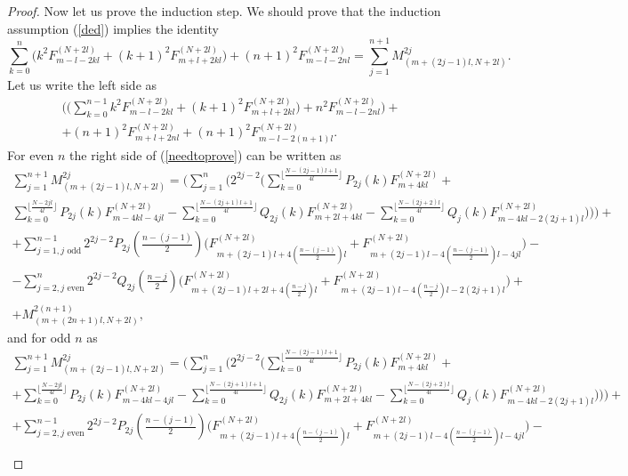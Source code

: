 \documentclass[11pt]{amsart}
\begin{document}
\begin{proof}
	Now let us prove the induction step. We should prove that the induction assumption (\ref{ded}) implies the identity
    \begin{equation}\label{needtoprove}
	\sum_{k=0}^{n}\big(k^2F^{(N+2l)}_{m-l-2kl}+(k+1)^2 F^{(N+2l)}_{m+l+2kl}\big)+(n+1)^2F^{(N+2l)}_{m-l-2nl}=\sum_{j=1}^{n+1}M^{2j}_{(m+(2j-1)l,N+2l)}.
	\end{equation}
	Let us write the left side as
	\begin{eqnarray*}
	\Big(\big(\sum_{k=0}^{n-1}k^2F^{(N+2l)}_{m-l-2kl}+(k+1)^2 F^{(N+2l)}_{m+l+2kl}\big)+n^2F^{(N+2l)}_{m-l-2nl}\Big)+\nonumber \\
	+(n+1)^2 F^{(N+2l)}_{m+l+2nl}+(n+1)^2F^{(N+2l)}_{m-l-2(n+1)l}.
	\end{eqnarray*}
	For even $n$ the right side of (\ref{needtoprove}) can be written as 
	\begin{eqnarray}\label{id-proof}
	\sum_{j=1}^{n+1}M^{2j}_{(m+(2j-1)l,N+2l)}=\Big(\sum_{j=1}^{n}\Big(
	2^{2j-2}\big(\sum_{k=0}^{\lfloor\frac{N-(2j-1)l+1}{4l}\rfloor}P_{2j}(k) F^{(N+2l)}_{m+4kl}+\\
    \sum_{k=0}^{\lfloor\frac{N-2jl}{4l}\rfloor}P_{2j}(k)F^{(N+2l)}_{m-4kl-4jl}-\sum_{k=0}^{\lfloor\frac{N-(2j+1)l+1}{4l}\rfloor}Q_{2j}(k)F^{(N+2l)}_{m+2l+4kl}-\sum_{k=0}^{\lfloor\frac{N-(2j+2)l}{4l}\rfloor}Q_j(k)F^{(N+2l)}_{m-4kl-2(2j+1)l} \big)\Big) \Big)+\nonumber\\
	+\sum_{j=1,\text{$j$ odd}}^{n-1}2^{2j-2}P_{2j}(\frac{n-(j-1)}{2})\Big(F^{(N+2l)}_{m+(2j-1)l+4(\frac{n-(j-1)}{2})l}+F^{(N+2l)}_{m+(2j-1)l-4(\frac{n-(j-1)}{2})l-4jl}\Big)-\nonumber\\
	-\sum_{j=2,\text{$j$ even}}^{n}2^{2j-2}Q_{2j}(\frac{n-j}{2})\Big(F^{(N+2l)}_{m+(2j-1)l+2l+4(\frac{n-j}{2})l}+F^{(N+2l)}_{m+(2j-1)l-4(\frac{n-j}{2})l-2(2j+1)l}\Big)+\nonumber\\
	+M^{2(n+1)}_{(m+(2n+1)l,N+2l)},\nonumber
	\end{eqnarray}
	and for odd $n$ as	
	\begin{eqnarray*}
	\sum_{j=1}^{n+1}M^{2j}_{(m+(2j-1)l,N+2l)}=\Big(\sum_{j=1}^{n}\Big(
	2^{2j-2}\big(\sum_{k=0}^{\lfloor\frac{N-(2j-1)l+1}{4l}\rfloor}P_{2j}(k) F^{(N+2l)}_{m+4kl}+ \nonumber\\
	+\sum_{k=0}^{\lfloor\frac{N-2jl}{4l}\rfloor}P_{2j}(k)F^{(N+2l)}_{m-4kl-4jl}-\sum_{k=0}^{\lfloor\frac{N-(2j+1)l+1}{4l}\rfloor}Q_{2j}(k)F^{(N+2l)}_{m+2l+4kl}-\sum_{k=0}^{\lfloor\frac{N-(2j+2)l}{4l}\rfloor}Q_j(k)F^{(N+2l)}_{m-4kl-2(2j+1)l} \big)\Big) \Big)+\nonumber\\
	+\sum_{j=2,\text{$j$ even}}^{n-1}2^{2j-2}P_{2j}(\frac{n-(j-1)}{2})\Big(F^{(N+2l)}_{m+(2j-1)l+4(\frac{n-(j-1)}{2})l}+F^{(N+2l)}_{m+(2j-1)l-4(\frac{n-(j-1)}{2})l-4jl}\Big)-\nonumber\\

\end{eqnarray*}
\end{proof}
\end{document}
